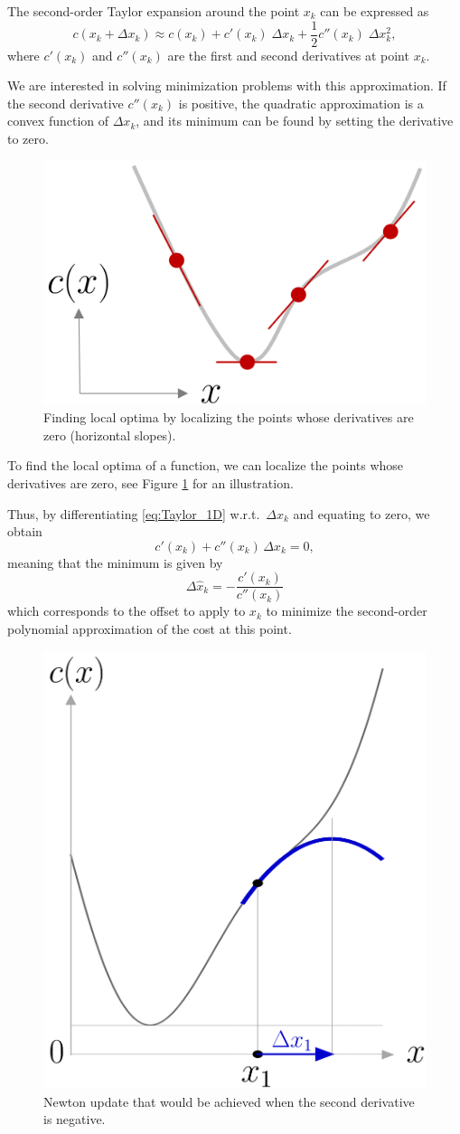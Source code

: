 \documentclass[10pt,a4paper]{article} %
\begin{document}
The second-order Taylor expansion around the point $x_k$ can be expressed as
\begin{equation}
	c(x_k\!+\!\Delta x_k) \approx c(x_k) + c'(x_k) \; \Delta x_k + \frac{1}{2} c''(x_k) \; \Delta x_k^2 ,
	\label{eq:Taylor_1D}
\end{equation}
where $c'(x_k)$ and $c''(x_k)$ are the first and second derivatives at point $x_k$.

We are interested in solving minimization problems with this approximation. If the second derivative $c''(x_k)$ is positive, the quadratic approximation is a convex function of $\Delta x_k$, and its minimum can be found by setting the derivative to zero.

\newpage

\begin{figure}
\vspace{-20pt}
\includegraphics[width=.26\textwidth]{images/optim_principle01.png}
\caption{\footnotesize
Finding local optima by localizing the points whose derivatives are zero (horizontal slopes).
}
\label{fig:optimPrinciple}
\end{figure}

To find the local optima of a function, we can localize the points whose derivatives are zero, see Figure \ref{fig:optimPrinciple} for an illustration.

Thus, by differentiating \eqref{eq:Taylor_1D} w.r.t.\ $\Delta x_k$ and equating to zero, we obtain 
\begin{equation*}
	c'(x_k) + c''(x_k) \, \Delta x_k = 0,
\end{equation*}
meaning that the minimum is given by
\begin{equation*}
	\Delta\hat{x}_k = - \frac{c'(x_k)}{c''(x_k)}
\end{equation*} 
which corresponds to the offset to apply to $x_k$ to minimize the second-order polynomial approximation of the cost at this point.

\begin{figure}
\centering
\includegraphics[width=.26\textwidth]{images/NewtonMethod_negativeHessian01.png}
\caption{\footnotesize
Newton update that would be achieved when the second derivative is negative.
}
\label{fig:NewtonNegativeHessian}
\end{figure}
\end{document}
